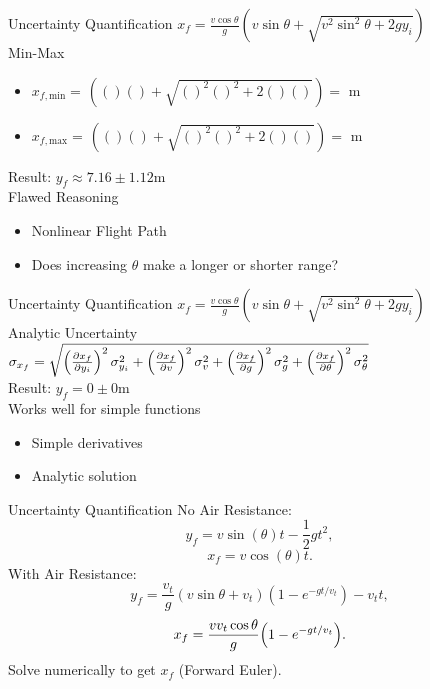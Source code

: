 \documentclass{beamer}
\begin{document}
\begin{frame}{Uncertainty Quantification}\vspace{-20pt}
$x_f=\frac{v\cos{\theta}}{g}\left(v\sin\theta+\sqrt{v^2\sin^2\theta + 2gy_i}\right)$\\
Min-Max
\begin{itemize}
\item $x_{f,\text{min}}=\frac{}{}\left(()()+\sqrt{()^2()^2+2()()}\right)=$ m
\item $x_{f,\text{max}}=\frac{}{}\left(()()+\sqrt{()^2()^2+2()()}\right)=$ m
\end{itemize} \vspace{15pt}
Result: $y_f\approx7.16\pm1.12$m \vspace{15pt}\\ \pause
Flawed Reasoning
\begin{itemize}
\item Nonlinear Flight Path
\item Does increasing $\theta$ make a longer or shorter range?
\end{itemize}
\end{frame}

\begin{frame}{Uncertainty Quantification}\vspace{-30pt}
$x_f=\frac{v\cos{\theta}}{g}\left(v\sin\theta+\sqrt{v^2\sin^2\theta + 2gy_i}\right)$\\\vspace{10pt}
Analytic Uncertainty\\ \vspace{10pt}
$\sigma_{x_f} = \sqrt{\left(\pdv{x_f}{y_i}\right)^2\sigma_{y_i}^2 + \left(\pdv{x_f}{v}\right)^2\sigma_{v}^2 + \left(\pdv{x_f}{g}\right)^2\sigma_{g}^2 + \left(\pdv{x_f}{\theta}\right)^2\sigma_{\theta}^2}$ \vspace{20pt}\\
Result: $y_f=0\pm0$m \vspace{15pt} \\
Works well for simple functions
\begin{itemize}
\item Simple derivatives
\item Analytic solution
\end{itemize}
\end{frame}

\begin{frame}{Uncertainty Quantification}
No Air Resistance:
\begin{equation}
y_f=v\sin(\theta)t - \frac{1}{2}gt^2,
\end{equation}
\begin{equation}
x_f=v\cos(\theta)t.
\end{equation}
With Air Resistance:
\begin{equation}
y_f=\frac{v_t}{g}(v\sin\theta+v_t)\left(1-e^{-gt/v_t}\right)-v_tt,
\end{equation}
\begin{equation}
x_f=\frac{vv_t\cos\theta}{g}\qty(1-e^{-gt/v_t}).
\end{equation}
\hspace{30pt}Solve numerically to get $x_f$ (Forward Euler).
\end{frame}
\end{document}
